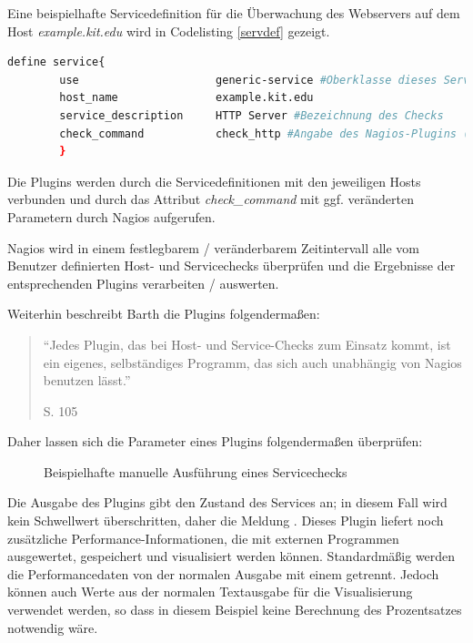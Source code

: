 Eine beispielhafte Servicedefinition für die Überwachung des Webservers auf dem Host \textit{example.kit.edu} wird in Codelisting \ref{servdef} gezeigt.

\begin{lstlisting}[captionpos=b, caption=Verkürzte Definition eines Hostobjektes, label=servdef, breaklines = true, language=sh]
define service{
        use                     generic-service #Oberklasse dieses Service-Objektes
        host_name               example.kit.edu
        service_description     HTTP Server #Bezeichnung des Checks
        check_command           check_http #Angabe des Nagios-Plugins (hier ohne Parameter)
        }

\end{lstlisting}

Die Plugins werden durch die Servicedefinitionen mit den jeweiligen Hosts verbunden und durch das Attribut \textit{check\_command} mit ggf. veränderten Parametern durch Nagios aufgerufen.

Nagios wird in einem festlegbarem / veränderbarem Zeitintervall alle vom Benutzer definierten Host- und Servicechecks überprüfen und die Ergebnisse der entsprechenden Plugins verarbeiten / auswerten.

Weiterhin beschreibt Barth die Plugins folgendermaßen:
\begin{quote}"`Jedes Plugin, das bei Host- und Service-Checks zum Einsatz kommt, ist ein eigenes, selbständiges Programm, das sich auch unabhängig von Nagios benutzen lässt."' \begin{flushright}\cite{Barth08} S. 105\end{flushright}\end{quote} 

Daher lassen sich die Parameter eines Plugins folgendermaßen überprüfen:

\begin{figure}[ht]
	\centering
		\caption{Beispielhafte manuelle Ausführung eines Servicechecks}
		\label{check-swap}
\end{figure}

Die Ausgabe des Plugins gibt den Zustand des Services an; in diesem Fall wird kein Schwellwert überschritten, daher die Meldung .
Dieses Plugin liefert noch zusätzliche Performance-Informationen, die mit externen Programmen ausgewertet, gespeichert und visualisiert werden können.
Standardmäßig werden die Performancedaten von der normalen Ausgabe mit einem \pictext{|} getrennt.
Jedoch können auch Werte aus der normalen Textausgabe für die Visualisierung verwendet werden, so dass in diesem Beispiel keine Berechnung des Prozentsatzes notwendig wäre.

